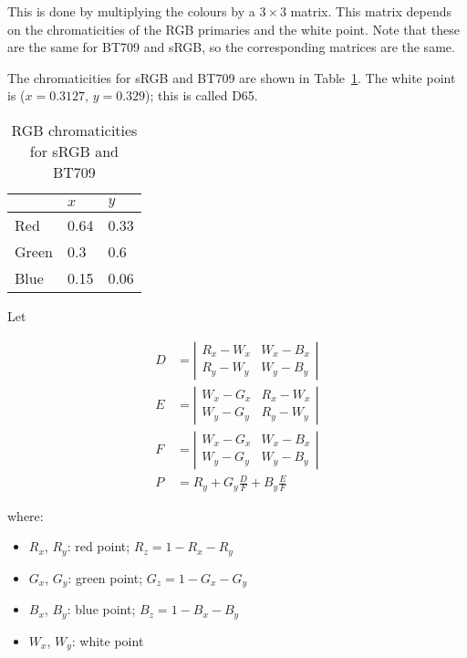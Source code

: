 \documentclass{article}
\begin{document}
This is done by multiplying the colours by a $3\times{}3$ matrix.
This matrix depends on the chromaticities of the RGB primaries and the
white point.  Note that these are the same for BT709 and sRGB, so the
corresponding matrices are the same.

The chromaticities for sRGB and BT709 are shown in
Table~\ref{tab:chromaticities}.  The white point is ($x = 0.3127$, $y
= 0.329$); this is called D65.

\begin{table}[ht]
\begin{center}
\begin{tabular}{|l|l|l|}
\hline
& $x$ & $y$ \\
\hline
Red & 0.64 & 0.33 \\
\hline
Green & 0.3 & 0.6 \\
\hline
Blue & 0.15 & 0.06 \\
\hline
\end{tabular}
\end{center}
\caption{RGB chromaticities for sRGB and BT709}
\label{tab:chromaticities}
\end{table}

Let

\begin{align}
D &= \left|\begin{matrix} R_x - W_x & W_x - B_x \\ R_y - W_y & W_y - B_y \end{matrix} \right| \\
E &= \left|\begin{matrix} W_x - G_x & R_x - W_x \\ W_y - G_y & R_y - W_y \end{matrix} \right| \\
F &= \left|\begin{matrix} W_x - G_x & W_x - B_x \\ W_y - G_y & W_y - B_y \end{matrix} \right| \\
P &= R_y + G_y \frac{D}{F} + B_y \frac{E}{F}
\end{align}

where:

\begin{itemize}
\item $R_x$, $R_y$: red point; $R_z = 1 - R_x - R_y$
\item $G_x$, $G_y$: green point; $G_z = 1 - G_x - G_y$
\item $B_x$, $B_y$: blue point; $B_z = 1 - B_x - B_y$
\item $W_x$, $W_y$: white point
\end{itemize}
\end{document}
